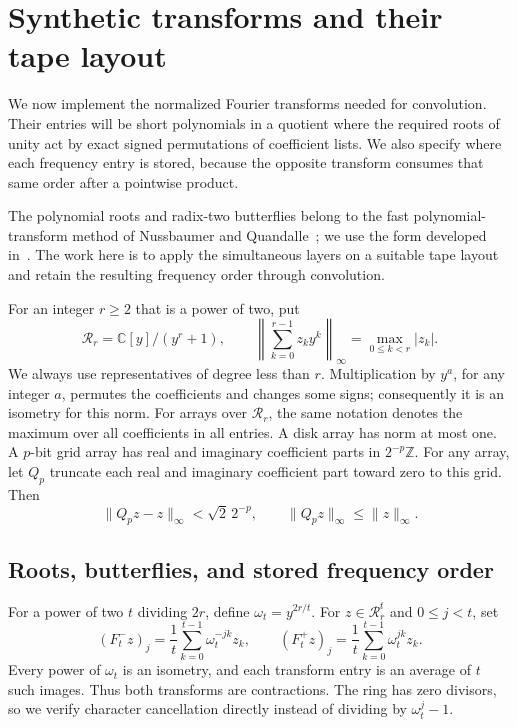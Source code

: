 \section{Synthetic transforms and their tape layout}
\label{sec:synthetic-layouts}

We now implement the normalized Fourier transforms needed for
convolution.  Their entries will be short polynomials in a quotient
where the required roots of unity act by exact signed permutations
of coefficient lists.  We also specify where each frequency entry
is stored, because the opposite transform consumes that same order
after a pointwise product.

The polynomial roots and radix-two butterflies belong to the fast
polynomial-transform method of Nussbaumer and
Quandalle~\cite{NussbaumerQuandalle1978,Nussbaumer1980}; we use the
form developed in~\cite[Section~2.4 and Lemma~3.2]{HarveyHoeven2021}.
The work here is to apply the simultaneous layers on a suitable tape
layout and retain the resulting frequency order through convolution.

For an integer $r\geq 2$ that is a power of two, put
\[
 \mathcal R_r=\mathbb C[y]/(y^r+1),\qquad
 \left\|\sum_{k=0}^{r-1}z_k y^k\right\|_\infty
       =\max_{0\leq k<r}|z_k|.
\]
We always use representatives of degree less than $r$.  Multiplication
by $y^a$, for any integer $a$, permutes the coefficients and changes
some signs; consequently it is an isometry for this norm.  For arrays
over $\mathcal R_r$, the same notation denotes the maximum over all
coefficients in all entries.  A disk array has norm at most one.  A
$p$-bit grid array has real and imaginary coefficient parts in
$2^{-p}\mathbb Z$.  For any array, let $Q_p$ truncate each real and
imaginary coefficient part toward zero to this grid.  Then
\begin{equation}
 \|Q_p z-z\|_\infty<\sqrt2\,2^{-p},\qquad
 \|Q_p z\|_\infty\leq\|z\|_\infty.
 \label{eq:transform-truncate}
\end{equation}

\subsection{Roots, butterflies, and stored frequency order}

For a power of two $t$ dividing $2r$, define $\omega_t=y^{2r/t}$.
For $z\in\mathcal R_r^t$ and $0\leq j<t$, set
\[
 (F_t^-z)_j=\frac1t\sum_{k=0}^{t-1}\omega_t^{-jk}z_k,
 \qquad
 (F_t^+z)_j=\frac1t\sum_{k=0}^{t-1}\omega_t^{jk}z_k.
\]
Every power of $\omega_t$ is an isometry, and each transform entry is
an average of $t$ such images.  Thus both transforms are contractions.
The ring has zero divisors, so we verify character cancellation
directly instead of dividing by $\omega_t^j-1$.

